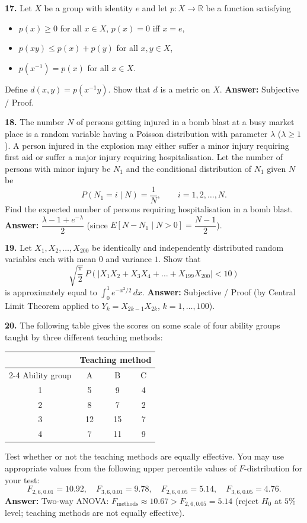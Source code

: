 \documentclass[11pt,a4paper]{article}
\newcommand{\ans}[1]{\textbf{Answer:} #1\par\medskip}
\begin{document}
\textbf{17.} Let $X$ be a group with identity $e$ and let $p : X \to \mathbb{R}$ be a function satisfying
\begin{itemize}
  \setlength{\itemsep}{2pt}\setlength{\parskip}{0pt}
  \item[(i)] $p(x) \ge 0$ for all $x \in X$, $p(x) = 0$ iff $x = e$,
  \item[(ii)] $p(xy) \le p(x) + p(y)$ for all $x, y \in X$,
  \item[(iii)] $p(x^{-1}) = p(x)$ for all $x \in X$.
\end{itemize}
Define $d(x, y) = p(x^{-1}y)$. Show that $d$ is a metric on $X$.
\ans{Subjective / Proof.}

\textbf{18.} The number $N$ of persons getting injured in a bomb blast at a busy market place is a random variable having a Poisson distribution with parameter $\lambda$ ($\lambda \ge 1$). A person injured in the explosion may either suffer a minor injury requiring first aid or suffer a major injury requiring hospitalisation. Let the number of persons with minor injury be $N_1$ and the conditional distribution of $N_1$ given $N$ be
\[
  P(N_1 = i \mid N) = \frac{1}{N}, \qquad i = 1, 2, \dots, N.
\]
Find the expected number of persons requiring hospitalisation in a bomb blast.
\ans{$\dfrac{\lambda - 1 + e^{-\lambda}}{2}$ (since $E[N - N_1 \mid N > 0] = \dfrac{N-1}{2}$).}

\textbf{19.} Let $X_1, X_2, \dots, X_{200}$ be identically and independently distributed random variables each with mean $0$ and variance $1$. Show that
\[
  \sqrt{\frac{\pi}{2}}\, P(|X_1 X_2 + X_3 X_4 + \dots + X_{199} X_{200}| < 10)
\]
is approximately equal to $\displaystyle\int_0^1 e^{-x^2/2}\,dx$.
\ans{Subjective / Proof (by Central Limit Theorem applied to $Y_k = X_{2k-1}X_{2k}$, $k=1,\dots,100$).}

\textbf{20.} The following table gives the scores on some scale of four ability groups taught by three different teaching methods:
\begin{center}
\begin{tabular}{cccc}
  \toprule
  & \multicolumn{3}{c}{Teaching method} \\
  \cmidrule(lr){2-4}
  Ability group & A & B & C \\
  \midrule
  1 & 5 & 9 & 4 \\
  2 & 8 & 7 & 2 \\
  3 & 12 & 15 & 7 \\
  4 & 7 & 11 & 9 \\
  \bottomrule
\end{tabular}
\end{center}
Test whether or not the teaching methods are equally effective. You may use appropriate values from the following upper percentile values of $F$-distribution for your test:
\[
  F_{2,6,0.01} = 10.92, \quad F_{3,6,0.01} = 9.78, \quad F_{2,6,0.05} = 5.14, \quad F_{3,6,0.05} = 4.76.
\]
\ans{Two-way ANOVA: $F_{\text{methods}} \approx 10.67 > F_{2,6,0.05} = 5.14$ (reject $H_0$ at $5\%$ level; teaching methods are not equally effective).}
\end{document}
